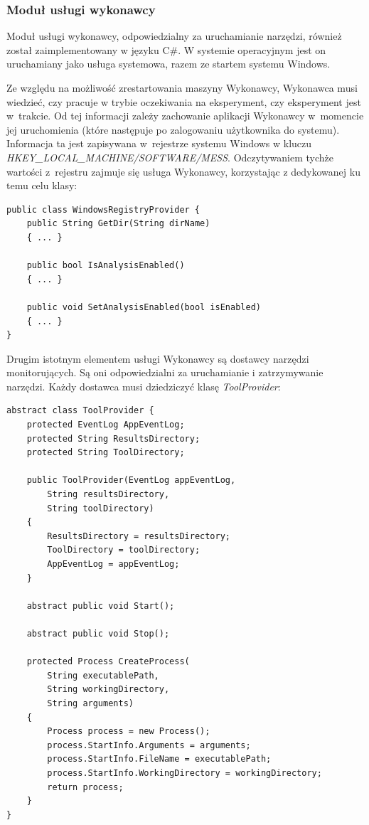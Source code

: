 \documentclass[a4paper,12pt,oneside]{article}
\begin{document}
	\subsubsection{Moduł usługi wykonawcy}
	
	Moduł usługi wykonawcy, odpowiedzialny za uruchamianie narzędzi, również został zaimplementowany w języku C\#. W systemie operacyjnym jest on uruchamiany jako usługa systemowa, razem ze startem systemu Windows. 
	
	Ze względu na możliwość zrestartowania maszyny Wykonawcy, Wykonawca musi wiedzieć, czy pracuje w trybie oczekiwania na eksperyment, czy eksperyment jest w~trakcie. Od tej informacji zależy zachowanie aplikacji Wykonawcy w~momencie jej uruchomienia (które następuje po zalogowaniu użytkownika do systemu). Informacja ta jest zapisywana w~rejestrze systemu Windows w kluczu \textit{HKEY\_LOCAL\_MACHINE/SOFTWARE/MESS}. Odczytywaniem tychże wartości z~rejestru zajmuje się usługa Wykonawcy, korzystając z dedykowanej ku temu celu klasy:
	
	\begin{lstlisting}[language={[Sharp]C}]
public class WindowsRegistryProvider {
    public String GetDir(String dirName)
    { ... }
    
    public bool IsAnalysisEnabled()
    { ... }

    public void SetAnalysisEnabled(bool isEnabled)
    { ... }
}
	\end{lstlisting}	
	
	Drugim istotnym elementem usługi Wykonawcy są dostawcy narzędzi monitorujących. Są oni odpowiedzialni za uruchamianie i zatrzymywanie narzędzi. Każdy dostawca musi dziedziczyć klasę \textit{ToolProvider}:
	\begin{lstlisting}[language={[Sharp]C}]
abstract class ToolProvider {
    protected EventLog AppEventLog;
    protected String ResultsDirectory;
    protected String ToolDirectory;
    
    public ToolProvider(EventLog appEventLog, 
	    String resultsDirectory, 
	    String toolDirectory)
    {
        ResultsDirectory = resultsDirectory;
        ToolDirectory = toolDirectory;
        AppEventLog = appEventLog;
    }

    abstract public void Start();

    abstract public void Stop();

    protected Process CreateProcess(
    	String executablePath, 
    	String workingDirectory, 
    	String arguments)
    {
        Process process = new Process();
        process.StartInfo.Arguments = arguments;
        process.StartInfo.FileName = executablePath;
        process.StartInfo.WorkingDirectory = workingDirectory;
        return process;
    }
}
	\end{lstlisting}
	
\end{document}
